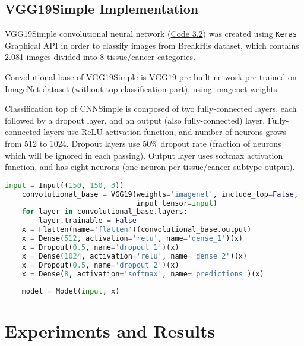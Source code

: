 \subsection{VGG19Simple Implementation}

VGG19Simple convolutional neural network (\textcolor{red}{\hyperref[src:py2]{Code 3.2}}) was created using \texttt{Keras} Graphical API in order to classify images from BreakHis dataset, which contains 2.081 images divided into 8 tissue/cancer categories. 

Convolutional base of VGG19Simple is VGG19 \cite{simonyan2014very} pre-built network pre-trained on ImageNet \cite{deng2009imagenet} dataset (without top classification part), using imagenet weights.

Classification top of CNNSimple is composed of two fully-connected layers, each followed by a dropout layer, and an output (also fully-connected) layer. Fully-connected layers use ReLU activation function, and number of neurons grows from 512 to 1024. Dropout layers use 50\% dropout rate (fraction of neurons which will be ignored in each passing). Output layer uses softmax activation function, and has eight neurons (one neuron per tissue/cancer subtype output). 

\vspace{3mm}
\begin{lstlisting}[language={Python}, basicstyle=\scriptsize]
	input = Input((150, 150, 3))
	convolutional_base = VGG19(weights='imagenet', include_top=False,
	                           input_tensor=input)
	for layer in convolutional_base.layers:
		layer.trainable = False
	x = Flatten(name='flatten')(convolutional_base.output)
	x = Dense(512, activation='relu', name='dense_1')(x)
	x = Dropout(0.5, name='dropout_1')(x)
	x = Dense(1024, activation='relu', name='dense_2')(x)
	x = Dropout(0.5, name='dropout_2')(x)
	x = Dense(8, activation='softmax', name='predictions')(x)
	
	model = Model(input, x)
\end{lstlisting} 

\section{Experiments and Results}
\label{exp}

